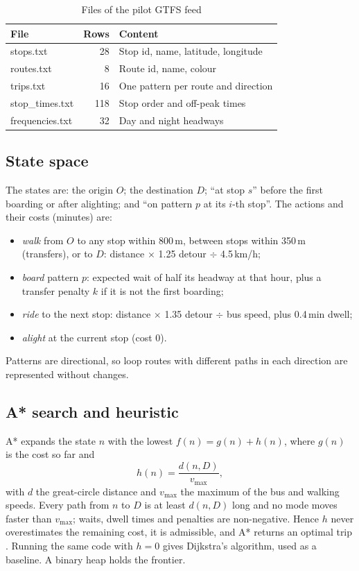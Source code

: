 \documentclass[10pt,twocolumn,letterpaper]{article}
\begin{document}
\begin{table}[t]
\caption{Files of the pilot GTFS feed}\label{tab:gtfs}
\centering\footnotesize
\begin{tabular}{@{}lrl@{}}
\toprule
File & Rows & Content \\
\midrule
stops.txt & 28 & Stop id, name, latitude, longitude \\
routes.txt & 8 & Route id, name, colour \\
trips.txt & 16 & One pattern per route and direction \\
stop\_times.txt & 118 & Stop order and off-peak times \\
frequencies.txt & 32 & Day and night headways \\
\bottomrule
\end{tabular}
\end{table}

\subsection{State space}
The states are: the origin $O$; the destination $D$; ``at stop $s$'' before the first boarding or after alighting; and ``on pattern $p$ at its $i$-th stop''. The actions and their costs (minutes) are:
\begin{itemize}
\item \emph{walk} from $O$ to any stop within 800\,m, between stops within 350\,m (transfers), or to $D$: distance $\times$ 1.25 detour $\div$ 4.5\,km/h;
\item \emph{board} pattern $p$: expected wait of half its headway at that hour, plus a transfer penalty $k$ if it is not the first boarding;
\item \emph{ride} to the next stop: distance $\times$ 1.35 detour $\div$ bus speed, plus 0.4\,min dwell;
\item \emph{alight} at the current stop (cost 0).
\end{itemize}
Patterns are directional, so loop routes with different paths in each direction are represented without changes.

\subsection{A* search and heuristic}
A* expands the state $n$ with the lowest $f(n) = g(n) + h(n)$, where $g(n)$ is the cost so far and
\begin{equation}
h(n) = \frac{d(n, D)}{v_{\max}},
\end{equation}
with $d$ the great-circle distance and $v_{\max}$ the maximum of the bus and walking speeds. Every path from $n$ to $D$ is at least $d(n,D)$ long and no mode moves faster than $v_{\max}$; waits, dwell times and penalties are non-negative. Hence $h$ never overestimates the remaining cost, it is admissible, and A* returns an optimal trip \cite{hart1968}. Running the same code with $h=0$ gives Dijkstra's algorithm, used as a baseline. A binary heap holds the frontier.
\end{document}
